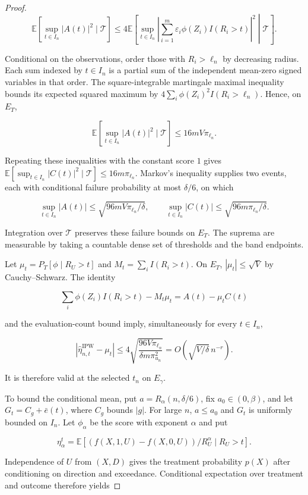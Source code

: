 \documentclass[12pt]{article}
\theoremstyle{plain}
\theoremstyle{definition}
\begin{document}
\begin{proof}
\[
\mathbb E[\sup_{t\in I_n}|A(t)|^2\mid\mathcal T]\leq4\mathbb E\left[\sup_{t\in I_n}\left|\sum_{i=1}^{m}\varepsilon_i\phi(Z_i)I(R_i>t)\right|^2\middle|\mathcal T\right].
\]

Conditional on the observations, order those with $R_i>\ell_n$ by decreasing radius. Each sum indexed by $t\in I_n$ is a partial sum of the independent mean-zero signed variables in that order. The square-integrable martingale maximal inequality bounds its expected squared maximum by $4\sum_i\phi(Z_i)^2I(R_i>\ell_n)$. Hence, on $E_T$,

\[
\mathbb E[\sup_{t\in I_n}|A(t)|^2\mid\mathcal T]\leq16mV\pi_{\ell_n}.
\]

Repeating these inequalities with the constant score $1$ gives $\mathbb E[\sup_{t\in I_n}|C(t)|^2\mid\mathcal T]\leq16m\pi_{\ell_n}$. Markov's inequality supplies two events, each with conditional failure probability at most $\delta/6$, on which

\[
\sup_{t\in I_n}|A(t)|\leq\sqrt{96mV\pi_{\ell_n}/\delta},\qquad \sup_{t\in I_n}|C(t)|\leq\sqrt{96m\pi_{\ell_n}/\delta}.
\]

Integration over $\mathcal T$ preserves these failure bounds on $E_T$. The suprema are measurable by taking a countable dense set of thresholds and the band endpoints.

Let $\mu_t=P_T[\phi\mid R_U>t]$ and $M_t=\sum_i I(R_i>t)$. On $E_T$, $|\mu_t|\leq\sqrt V$ by Cauchy--Schwarz. The identity

\[
\sum_i\phi(Z_i)I(R_i>t)-M_t\mu_t=A(t)-\mu_t C(t)
\]

and the evaluation-count bound imply, simultaneously for every $t\in I_n$,

\[
|\hat\eta_{n,t}^{\text{IPW}}-\mu_t|\leq4\sqrt{\frac{96V\pi_{\ell_n}}{\delta m\pi_{u_n}^2}}=O(\sqrt{V/\delta}\,n^{-r}).
\]

It is therefore valid at the selected $t_n$ on $E_\gamma$.

To bound the conditional mean, put $a=R_\alpha(n,\delta/6)$, fix $a_0\in(0,\beta)$, and let $G_t=C_g+\bar e(t)$, where $C_g$ bounds $|g|$. For large $n$, $a\leq a_0$ and $G_t$ is uniformly bounded on $I_n$. Let $\phi_\alpha$ be the score with exponent $\alpha$ and put

\[
\eta_\alpha^t=\mathbb E[(f(X,1,U)-f(X,0,U))/R_U^\alpha\mid R_U>t].
\]

Independence of $U$ from $(X,D)$ gives the treatment probability $p(X)$ after conditioning on direction and exceedance. Conditional expectation over treatment and outcome therefore yields


\end{proof}
\end{document}
